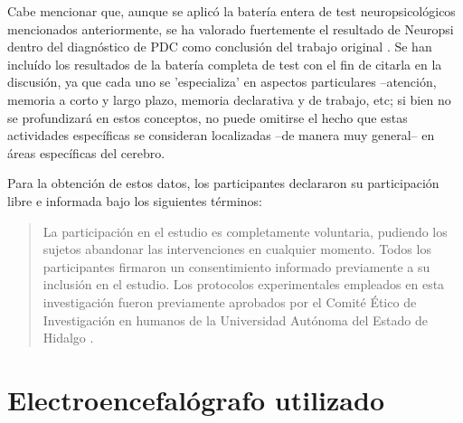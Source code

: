 \documentclass[12pt,a4paper]{mitthesis}
\begin{document}
Cabe mencionar que, aunque se aplic\'o la bater\'ia entera de test neuropsicol\'ogicos mencionados
anteriormente, se ha valorado fuertemente el resultado de Neuropsi dentro del diagn\'ostico de PDC
como conclusi\'on del trabajo original \cite{VazquezTagle16}.
Se han inclu\'ido los resultados de la bater\'ia completa de test con el fin de citarla en la 
discusi\'on, ya que cada uno se 'especializa' en aspectos particulares --atenci\'on, memoria a 
corto y largo plazo, memoria declarativa y de trabajo, etc; si bien no se profundizar\'a en estos
conceptos, no puede omitirse el hecho que estas actividades espec\'ificas se consideran localizadas 
--de manera muy general-- en \'areas espec\'ificas del cerebro.

Para la obtenci\'on de estos datos, los participantes declararon su participaci\'on libre e 
informada bajo los siguientes t\'erminos:
\begin{quote}
La participaci\'on en el estudio es completamente voluntaria, pudiendo los sujetos abandonar las 
intervenciones en cualquier momento. Todos los participantes firmaron un consentimiento informado 
previamente a su inclusi\'on en el estudio. 
Los protocolos experimentales empleados en esta investigaci\'on fueron previamente aprobados por 
el Comit\'e \'Etico de Investigaci\'on en humanos de la Universidad Autónoma del Estado de Hidalgo
\cite{VazquezTagle16}.
\end{quote}


\section{Electroencefal\'ografo utilizado}
\end{document}
